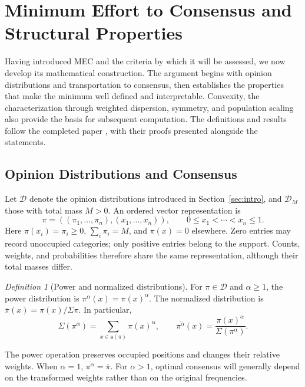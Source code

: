 \documentclass{article}
\theoremstyle{plain}
\theoremstyle{remark}
\newtheorem{definition}{Definition}
\begin{document}
\section{Minimum Effort to Consensus and Structural Properties}\label{sec:mec-foundations}

Having introduced MEC and the criteria by which it will be assessed, we now develop its mathematical construction. The argument begins with opinion distributions and transportation to consensus, then establishes the properties that make the minimum well defined and interpretable. Convexity, the characterization through weighted dispersion, symmetry, and population scaling also provide the basis for subsequent computation. The definitions and results follow the completed paper \citep{aranda2026mec}, with their proofs presented alongside the statements.

\subsection{Opinion Distributions and Consensus}\label{subsec:mec-distributions}

Let $\mathcal{D}$ denote the opinion distributions introduced in Section~\ref{sec:intro}, and $\mathcal{D}_M$ those with total mass $M>0$. An ordered vector representation is
\[
\pi=((\pi_1,\ldots,\pi_n),(x_1,\ldots,x_n)),
\qquad 0\leq x_1<\cdots<x_n\leq1.
\]
Here $\pi(x_i)=\pi_i\geq0$, $\sum_i\pi_i=M$, and $\pi(x)=0$ elsewhere. Zero entries may record unoccupied categories; only positive entries belong to the support. Counts, weights, and probabilities therefore share the same representation, although their total masses differ.

\begin{definition}[Power and normalized distributions]\label{def:mec-power}
For $\pi\in\mathcal{D}$ and $\alpha\geq1$, the power distribution is $\pi^\alpha(x)=\pi(x)^\alpha$. The normalized distribution is $\overline{\pi}(x)=\pi(x)/\Sigma\pi$. In particular,
\begin{equation}\label{eq:mec-power-normalization}
\Sigma(\pi^\alpha)=\sum_{x\in\boldsymbol{s}(\pi)}\pi(x)^\alpha,
\qquad
\overline{\pi^\alpha}(x)=\frac{\pi(x)^\alpha}{\Sigma(\pi^\alpha)}.
\end{equation}
\end{definition}
The power operation preserves occupied positions and changes their relative weights. When $\alpha=1$, $\overline{\pi^\alpha}=\overline{\pi}$. For $\alpha>1$, optimal consensus will generally depend on the transformed weights rather than on the original frequencies.
\end{document}
